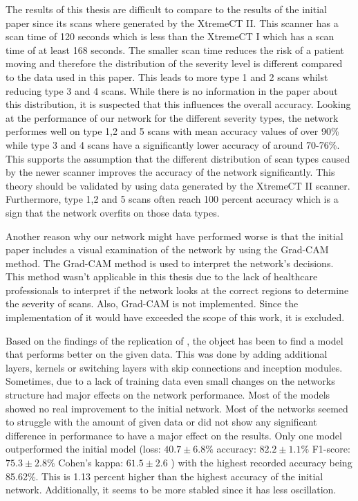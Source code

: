 \documentclass[
a4paper, 
12pt,
grayscalebody, %
abstract=on,
twoside, BCOR10mm, 12pt, DIV13,headinclude, footexclude, final, abstracton, openright
]{ibireprt}
\numberwithin{equation}{chapter}
\numberwithin{table}{chapter}
\numberwithin{figure}{chapter}
\numberwithin{algorithm}{chapter}
\numberwithin{example}{chapter}
\numberwithin{example}{chapter}
\begin{document}
The results of this thesis are difficult to compare to the results of the initial paper since its scans where generated by the XtremeCT II. \cite{Walle2023} This scanner has a scan time of 120 seconds which is less than the XtremeCT I which has a scan time of at least 168 seconds. \cite{Tran2019} The smaller scan time reduces the risk of a patient moving and therefore the distribution of the severity level is different compared to the data used in this paper. This leads to more type 1 and 2 scans whilst reducing type 3 and 4 scans. While there is no information in the paper \cite{Walle2023} about this distribution, it is suspected that this influences the overall accuracy. Looking at the performance of our network for the different severity types, the network performes well on type 1,2 and 5 scans with mean accuracy values of over 90\% while type 3 and 4 scans have a significantly lower accuracy of around 70-76\%. This supports the assumption that the different distribution of scan types caused by the newer scanner improves the accuracy of the network significantly. This theory should be validated by using data generated by the XtremeCT II scanner. Furthermore, type 1,2 and 5 scans often reach 100 percent accuracy which is a sign that the network overfits on those data types. 

Another reason why our network might have performed worse is that the initial paper includes a visual examination of the network by using the Grad-CAM method. The Grad-CAM method is used to interpret the network's decisions. This method wasn't applicable in this thesis due to the lack of healthcare professionals to interpret if the network looks at the correct regions to determine the severity of scans. Also, Grad-CAM is not implemented. Since the implementation of it would have exceeded the scope of this work, it is excluded. 

Based on the findings of the replication of \cite{Walle2023}, the object has been to find a model that performs better on the given data. This was done by adding additional layers, kernels or switching layers with skip connections and inception modules. Sometimes, due to a lack of training data even small changes on the networks structure had major effects on the network performance. Most of the models showed no real improvement to the initial network. Most of the networks seemed to struggle with the amount of given data or did not show any significant difference in performance to have a major effect on the results. Only one model outperformed the initial model (loss: $40.7\pm6.8\% $ accuracy: $82.2\pm1.1\%$ F1-score: $75.3\pm2.8\%$  Cohen's kappa: $61.5\pm2.6$ ) with the highest recorded accuracy being 85.62\%. This is 1.13 percent higher than the highest accuracy of the initial network. Additionally, it seems to be more stabled since it has less oscillation. 
\end{document}
